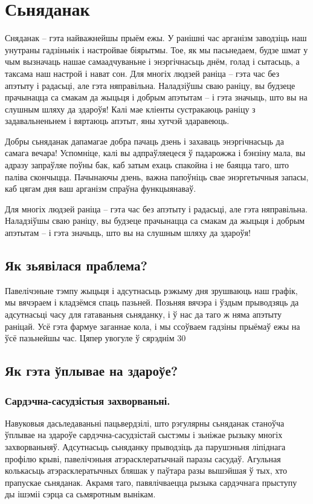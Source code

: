 \chapter{Сьняданак}

Сняданак – гэта найважнейшы прыём ежы. У ранішні час арганізм заводзіць наш унутраны гадзіньнік і настройвае біярытмы. Тое, як мы пасьнедаем, будзе шмат у чым вызначаць нашае самаадчуваньне і энэргічнасьць днём, голад і сытасьць, а таксама наш настрой і нават сон. Для многіх людзей раніца – гэта час без апэтыту і радасьці, але гэта няправільна. Наладзіўшы сваю раніцу, вы будзеце прачынацца са смакам да жыцьця і добрым апэтытам – і гэта значыць, што вы на слушным шляху да здароўя! Калі мае кліенты сустракаюць раніцу з задавальненьнем і вяртаюць апэтыт, яны хутчэй здаравеюць.

Добры сьняданак дапамагае добра пачаць дзень і захаваць энэргічнасьць да самага вечара! Успомніце, калі вы адпраўляецеся ў падарожжа і бэнзіну мала, вы адразу запраўляе поўны бак, каб затым ехаць спакойна і не баяцца таго, што паліва скончыцца. Пачынаючы дзень, важна папоўніць свае энэргетычныя запасы, каб цягам дня ваш арганізм спраўна функцыянаваў.

Для многіх людзей раніца – гэта час без апэтыту і радасьці, але гэта няправільна. Наладзіўшы сваю раніцу, вы будзеце прачынацца са смакам да жыцьця і добрым апэтытам – і гэта значыць, што вы на слушным шляху да здароўя!

\section{Як зьявілася праблема?}

Павелічэньне тэмпу жыцьця і адсутнасьць рэжыму дня зрушваюць наш графік, мы вячэраем і кладзёмся спаць пазьней. Позьняя вячэра і ўздым прыводзяць да адсутнасьці часу для гатаваньня сьняданку, і ў нас да таго ж няма апэтыту раніцай. Усё гэта фармуе заганнае кола, і мы ссоўваем гадзіны прыёмаў ежы на ўсё пазьнейшы час. Цяпер увогуле ў сярэднім 30%

\section{Як гэта ўплывае на здароўе?}

\subsection{Сардэчна-сасудзістыя захворваньні.}
Навуковыя дасьледаваньні пацьвердзілі, што рэгулярны сьняданак станоўча ўплывае на здароўе сардэчна-сасудзістай сыстэмы і зьніжае рызыку многіх захворваньняў. Адсутнасьць сьняданку прыводзіць да парушэньня ліпіднага профілю крыві, павелічэньня атэрасклератычнай паразы сасудаў. Агульная колькасьць атэрасклератычных бляшак у паўтара разы вышэйшая ў тых, хто прапускае сьняданак. Акрамя таго, павялічваецца рызыка сардэчнага прыступу ды ішэміі сэрца са сьмяротным вынікам.


